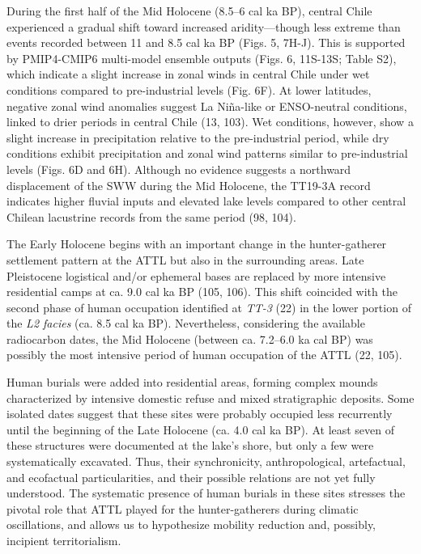 \documentclass[
]{article}
\begin{document}
During the first half of the Mid Holocene (8.5--6 cal ka BP), central
Chile experienced a gradual shift toward increased aridity---though less
extreme than events recorded between 11 and 8.5 cal ka BP (Figs. 5,
7H-J). This is supported by PMIP4-CMIP6 multi-model ensemble outputs
(Figs. 6, 11S-13S; Table S2), which indicate a slight increase in zonal
winds in central Chile under wet conditions compared to pre-industrial
levels (Fig. 6F). At lower latitudes, negative zonal wind anomalies
suggest La Niña-like or ENSO-neutral conditions, linked to drier periods
in central Chile (13, 103). Wet conditions, however, show a slight
increase in precipitation relative to the pre-industrial period, while
dry conditions exhibit precipitation and zonal wind patterns similar to
pre-industrial levels (Figs. 6D and 6H). Although no evidence suggests a
northward displacement of the SWW during the Mid Holocene, the TT19-3A
record indicates higher fluvial inputs and elevated lake levels compared
to other central Chilean lacustrine records from the same period (98,
104).

The Early Holocene begins with an important change in the
hunter-gatherer settlement pattern at the ATTL but also in the
surrounding areas. Late Pleistocene logistical and/or ephemeral bases
are replaced by more intensive residential camps at ca. 9.0 cal ka BP
(105, 106). This shift coincided with the second phase of human
occupation identified at \emph{TT-3} (22) in the lower portion of the
\emph{L2 facies} (ca. 8.5 cal ka BP). Nevertheless, considering the
available radiocarbon dates, the Mid Holocene (between ca. 7.2--6.0 ka
cal BP) was possibly the most intensive period of human occupation of
the ATTL (22, 105).

Human burials were added into residential areas, forming complex mounds
characterized by intensive domestic refuse and mixed stratigraphic
deposits. Some isolated dates suggest that these sites were probably
occupied less recurrently until the beginning of the Late Holocene (ca.
4.0 cal ka BP). At least seven of these structures were documented at
the lake's shore, but only a few were systematically excavated. Thus,
their synchronicity, anthropological, artefactual, and ecofactual
particularities, and their possible relations are not yet fully
understood. The systematic presence of human burials in these sites
stresses the pivotal role that ATTL played for the hunter-gatherers
during climatic oscillations, and allows us to hypothesize mobility
reduction and, possibly, incipient territorialism.
\end{document}
